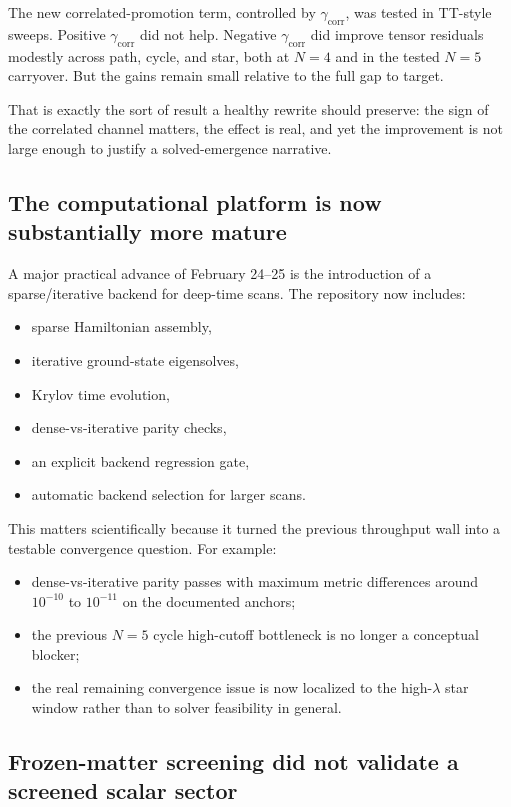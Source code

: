 \documentclass[11pt]{article}
\begin{document}
The new correlated-promotion term, controlled by $\gamma_{\mathrm{corr}}$, was tested in TT-style sweeps. Positive $\gamma_{\mathrm{corr}}$ did not help. Negative $\gamma_{\mathrm{corr}}$ did improve tensor residuals modestly across path, cycle, and star, both at $N=4$ and in the tested $N=5$ carryover. But the gains remain small relative to the full gap to target.

That is exactly the sort of result a healthy rewrite should preserve: the sign of the correlated channel matters, the effect is real, and yet the improvement is not large enough to justify a solved-emergence narrative.

\subsection{The computational platform is now substantially more mature}

A major practical advance of February 24--25 is the introduction of a sparse/iterative backend for deep-time scans. The repository now includes:

\begin{itemize}
    \item sparse Hamiltonian assembly,
    \item iterative ground-state eigensolves,
    \item Krylov time evolution,
    \item dense-vs-iterative parity checks,
    \item an explicit backend regression gate,
    \item automatic backend selection for larger scans.
\end{itemize}

This matters scientifically because it turned the previous throughput wall into a testable convergence question. For example:
\begin{itemize}
    \item dense-vs-iterative parity passes with maximum metric differences around $10^{-10}$ to $10^{-11}$ on the documented anchors;
    \item the previous $N=5$ cycle high-cutoff bottleneck is no longer a conceptual blocker;
    \item the real remaining convergence issue is now localized to the high-$\lambda$ star window rather than to solver feasibility in general.
\end{itemize}

\subsection{Frozen-matter screening did not validate a screened scalar sector}
\end{document}
